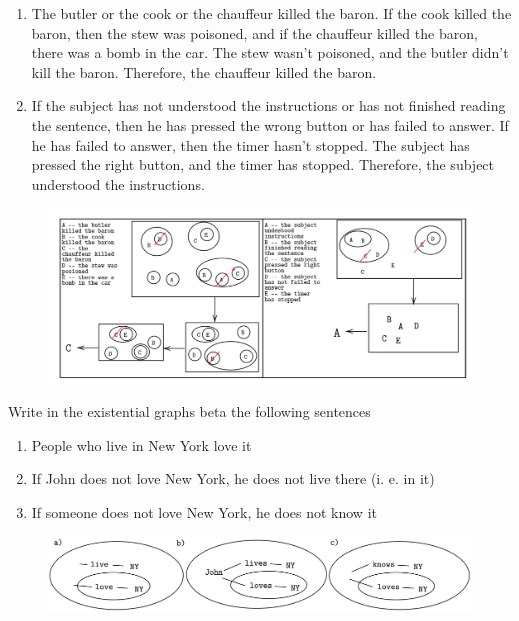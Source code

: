 \documentclass[12pt]{report}
\begin{document}
    \begin{problem}{}
        \begin{enumerate}
        \item The butler or the cook or the chauffeur killed the baron. If the cook killed the baron, then the stew was poisoned, and if the chauffeur killed the baron, there was a bomb in the car. The stew wasn’t poisoned, and the butler didn’t kill the baron. Therefore, the chauffeur killed the baron.
        \item If the subject has not understood the instructions or has not finished reading the sentence, then he has pressed the wrong button or has failed to answer. If he has failed to answer, then the timer hasn’t stopped. The subject has pressed the right button, and the timer has stopped. Therefore, the subject understood the instructions.
        \end{enumerate}
    \end{problem}
    \begin{figure}[H]
        \center
        \includegraphics[scale=0.8]{p3.png}
    \end{figure}
    \begin{problem}{}
        Write in the existential graphs beta the following sentences
        \begin{enumerate}
        \item People who live in New York love it
        \item If John does not love New York, he does not live there (i. e. in it)
        \item If someone does not love New York, he does not know it
        \end{enumerate}
    \end{problem}
    \begin{figure}[H]
        \center
        \includegraphics[scale=0.25]{p4.png}
    \end{figure}
\end{document}
